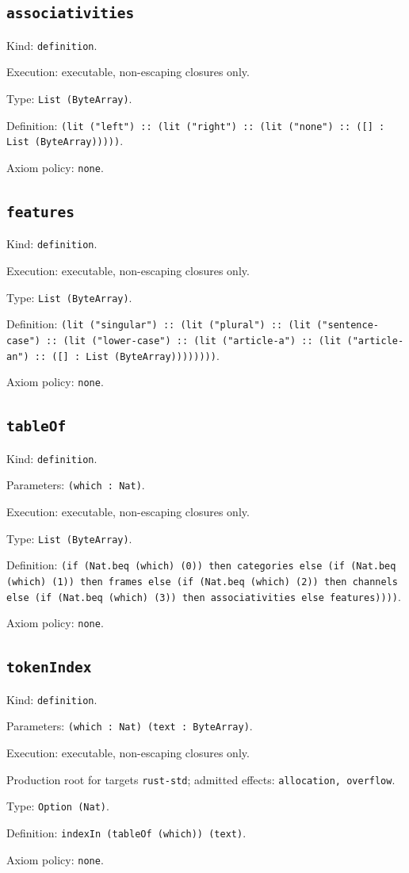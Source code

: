 \documentclass[11pt]{article}
\begin{document}
\subsection*{\texttt{associativities}}
\noindent Kind: \texttt{definition}.\par
\noindent Execution: executable, non-escaping closures only.\par
\noindent Type: \texttt{List (ByteArray)}.\par
\noindent Definition: \texttt{(lit ("left") :: (lit ("right") :: (lit ("none") :: ([] : List (ByteArray)))))}.\par
\noindent Axiom policy: \texttt{none}.\par
\subsection*{\texttt{features}}
\noindent Kind: \texttt{definition}.\par
\noindent Execution: executable, non-escaping closures only.\par
\noindent Type: \texttt{List (ByteArray)}.\par
\noindent Definition: \texttt{(lit ("singular") :: (lit ("plural") :: (lit ("sentence-case") :: (lit ("lower-case") :: (lit ("article-a") :: (lit ("article-an") :: ([] : List (ByteArray))))))))}.\par
\noindent Axiom policy: \texttt{none}.\par
\subsection*{\texttt{tableOf}}
\noindent Kind: \texttt{definition}.\par
\noindent Parameters: \texttt{(which : Nat)}.\par
\noindent Execution: executable, non-escaping closures only.\par
\noindent Type: \texttt{List (ByteArray)}.\par
\noindent Definition: \texttt{(if (Nat.beq (which) (0)) then categories else (if (Nat.beq (which) (1)) then frames else (if (Nat.beq (which) (2)) then channels else (if (Nat.beq (which) (3)) then associativities else features))))}.\par
\noindent Axiom policy: \texttt{none}.\par
\subsection*{\texttt{tokenIndex}}
\noindent Kind: \texttt{definition}.\par
\noindent Parameters: \texttt{(which : Nat) (text : ByteArray)}.\par
\noindent Execution: executable, non-escaping closures only.\par
\noindent Production root for targets \texttt{rust-std}; admitted effects: \texttt{allocation, overflow}.\par
\noindent Type: \texttt{Option (Nat)}.\par
\noindent Definition: \texttt{indexIn (tableOf (which)) (text)}.\par
\noindent Axiom policy: \texttt{none}.\par
\end{document}
